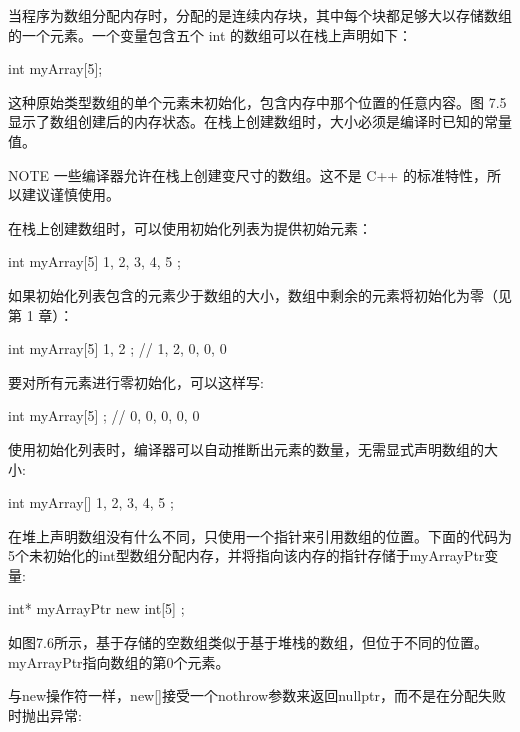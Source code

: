 当程序为数组分配内存时，分配的是连续内存块，其中每个块都足够大以存储数组的一个元素。一个变量包含五个 int 的数组可以在栈上声明如下：

\begin{cpp}
int myArray[5];
\end{cpp}

这种原始类型数组的单个元素未初始化，包含内存中那个位置的任意内容。图 7.5 显示了数组创建后的内存状态。在栈上创建数组时，大小必须是编译时已知的常量值。


\begin{myNotic}{NOTE}
一些编译器允许在栈上创建变尺寸的数组。这不是 C++ 的标准特性，所以建议谨慎使用。
\end{myNotic}

在栈上创建数组时，可以使用初始化列表为提供初始元素：

\begin{cpp}
int myArray[5] { 1, 2, 3, 4, 5 };
\end{cpp}

如果初始化列表包含的元素少于数组的大小，数组中剩余的元素将初始化为零（见第 1 章）：

\begin{cpp}
int myArray[5] { 1, 2 }; // 1, 2, 0, 0, 0
\end{cpp}

要对所有元素进行零初始化，可以这样写:

\begin{cpp}
int myArray[5] { }; // 0, 0, 0, 0, 0
\end{cpp}

使用初始化列表时，编译器可以自动推断出元素的数量，无需显式声明数组的大小:

\begin{cpp}
int myArray[] { 1, 2, 3, 4, 5 };
\end{cpp}

在堆上声明数组没有什么不同，只使用一个指针来引用数组的位置。下面的代码为5个未初始化的int型数组分配内存，并将指向该内存的指针存储于myArrayPtr变量:

\begin{cpp}
int* myArrayPtr { new int[5] };
\end{cpp}

如图7.6所示，基于存储的空数组类似于基于堆栈的数组，但位于不同的位置。myArrayPtr指向数组的第0个元素。

与new操作符一样，new[]接受一个nothrow参数来返回nullptr，而不是在分配失败时抛出异常:

